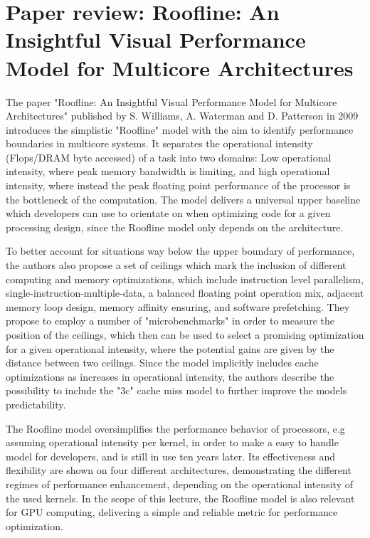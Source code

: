 \section{Paper review: Roofline: An Insightful Visual Performance Model for Multicore Architectures}
The paper "Roofline: An Insightful Visual Performance Model for Multicore Architectures" published by S. Williams, A. Waterman and D. Patterson in 2009 introduces the simplistic "Roofline" model with the aim to identify performance boundaries in multicore systems. It separates the operational intensity (Flops/DRAM byte accessed) of a task into two domains: Low operational intensity, where peak memory bandwidth is limiting, and high operational intensity, where instead the peak floating point performance of the processor is the bottleneck of the computation. The model delivers a universal upper baseline which developers can use to orientate on when optimizing code for a given processing design, since the Roofline model only depends on the architecture.

To better account for situations way below the upper boundary of performance, the authors also propose a set of ceilings which mark the inclusion of different computing and memory optimizations, which include instruction level parallelism, single-instruction-multiple-data, a balanced floating point operation mix, adjacent memory loop design, memory affinity ensuring, and software prefetching. They propose to employ a number of "microbenchmarks" in order to measure the position of the ceilings, which then can be used to select a promising optimization for a given operational intensity, where the potential gains are given by the distance between two ceilings. Since the model implicitly includes cache optimizations as increases in operational intensity, the authors describe the possibility to include the "3c" cache miss model to further improve the models predictability.

The Roofline model oversimplifies the performance behavior of processors, e.g assuming operational intensity per kernel, in order to make a easy to handle model for developers, and is still in use ten years later. Its effectiveness and flexibility are shown on four different architectures, demonstrating the different regimes of performance enhancement, depending on the operational intensity of the used kernels. In the scope of this lecture, the Roofline model is also relevant for GPU computing, delivering a simple and reliable metric for performance optimization.




